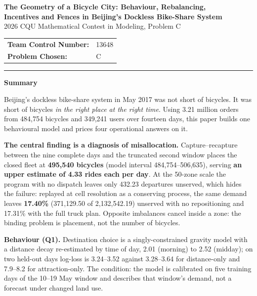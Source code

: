\begin{center}
{\Large\bfseries The Geometry of a Bicycle City: Behaviour, Rebalancing,\\ Incentives and Fences in Beijing's Dockless Bike-Share System}\\[6pt]
{\large 2026 CQU Mathematical Contest in Modeling, Problem C}\\[10pt]
\begin{tabular}{ll}
\textbf{Team Control Number:} & 13648 \\
\textbf{Problem Chosen:} & C \\
\end{tabular}
\end{center}

\vspace{4pt}
\hrule
\vspace{8pt}

\begin{center}{\large\bfseries Summary}\end{center}

Beijing's dockless bike-share system in May 2017 was not short of bicycles. It was
short of bicycles \emph{in the right place at the right time}. Using 3.21 million orders
from 484,754 bicycles and 349,241 users over fourteen days, this paper builds one
behavioural model and prices four operational answers on it.

\textbf{The central finding is a diagnosis of misallocation.} Capture--recapture between
the nine complete days and the truncated second window places the closed fleet at
\textbf{495,540 bicycles} (model interval 484,754--506,635), serving \textbf{an upper
estimate of 4.33 rides each per day}. At the 50-zone scale the program with no dispatch
leaves only 432.23 departures unserved, which hides the failure: replayed at cell
resolution as a conserving process, the same demand leaves \textbf{17.40\%}
(371,129.50 of 2,132,542.19) unserved with no repositioning and 17.31\% with the full
truck plan. Opposite imbalances cancel inside a zone: the binding problem is
placement, not the number of bicycles.

\textbf{Behaviour (Q1).} Destination choice is a singly-constrained gravity model with a
distance decay re-estimated by time of day, 2.01 (morning) to 2.52 (midday); on two
held-out days log-loss is 3.24--3.52 against 3.28--3.64 for distance-only and 7.9--8.2
for attraction-only. The condition: the model is calibrated on five training days of
the 10--19 May window and describes that window's demand, not a forecast under changed
land use.

